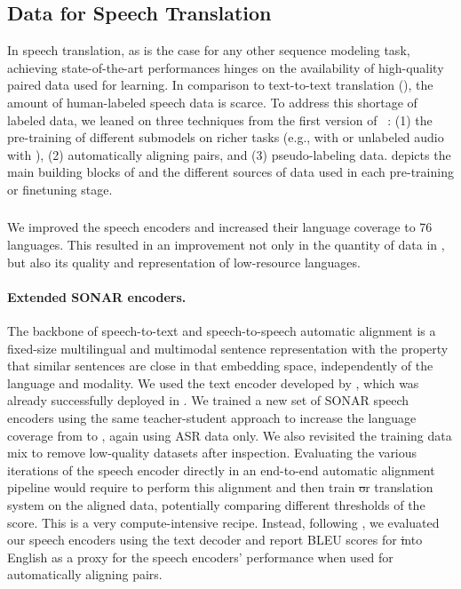 \subsection{Data for Speech Translation}\label{sec:offline:data}
In speech translation, as is the case for any other sequence modeling task,
achieving state-of-the-art performances hinges on the availability of high-quality paired data used for learning. In comparison to text-to-text translation (\mt), the amount of human-labeled speech data is scarce. To address this shortage of labeled data, we leaned on three techniques from the first version of \mfourt~\citep{SeamlessM4TArXiv}: 
(1) the pre-training of different submodels on richer tasks (e.g., \mt with \nllbv or unlabeled audio with \wvbert ),
(2) automatically aligning pairs,
and (3) pseudo-labeling \asr data.
 depicts the main building blocks of \mfourttwo and the different sources of data used in each pre-training or finetuning stage.

\subsubsection{\seamlessalign}\label{sec:offline:mineddata}
We improved the \sonar speech encoders and increased their language coverage to 76 languages. This resulted in an improvement not only in the quantity of data in \seamlessalign, but also its quality and representation of low-resource languages. 

\paragraph{Extended SONAR encoders.}
The backbone of speech-to-text and speech-to-speech automatic alignment is a fixed-size multilingual and multimodal sentence representation with the property that similar sentences are close in that embedding space, independently of the language and modality. We used the \sonar text encoder developed by \citet{Duquenne:2023:sonar_arxiv}, which was already successfully deployed in \citet{SeamlessM4TArXiv}.
We trained a new set of SONAR speech encoders using the same teacher-student approach to increase the language coverage from \NbLangsMined to \NbLangsMinedVtwo, again using ASR data only. 
We also revisited the training data mix to remove low-quality datasets after inspection.
Evaluating the various iterations of the speech encoder directly in an end-to-end automatic alignment pipeline would require to perform this alignment and then train \st or \sst translation system on the aligned data, potentially comparing different thresholds of the \sonar score. This is a very compute-intensive recipe.
Instead, following \citet{SeamlessM4TArXiv}, we evaluated our speech encoders using the \sonar text decoder and report BLEU scores for \st into English as a proxy for the speech encoders' performance when used for automatically aligning pairs.


